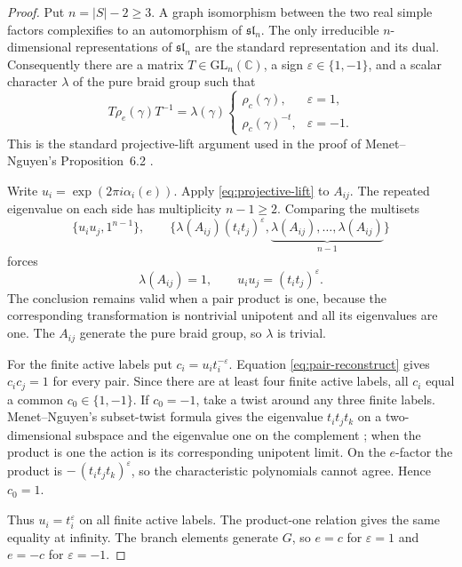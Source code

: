 \documentclass[11pt]{article}
\theoremstyle{definition}
\theoremstyle{remark}
\newcommand{\C}{\mathbb C}
\begin{document}
\begin{proof}
Put $n=|S|-2\ge3$.  A graph isomorphism between the two real simple factors complexifies to an automorphism of $\mathfrak{sl}_n$.  The only irreducible $n$-dimensional representations of $\mathfrak{sl}_n$ are the standard representation and its dual.  Consequently there are a matrix $T\in\mathrm{GL}_n(\C)$, a sign $\varepsilon\in\{1,-1\}$, and a scalar character $\lambda$ of the pure braid group such that
\begin{equation}\label{eq:projective-lift}
 T\rho_e(\gamma)T^{-1}
 =\lambda(\gamma)\begin{cases}
 \rho_c(\gamma),&\varepsilon=1,\\
 \rho_c(\gamma)^{-t},&\varepsilon=-1.
 \end{cases}
\end{equation}
This is the standard projective-lift argument used in the proof of Menet--Nguyen's Proposition~6.2 \cite{MN}.

Write $u_i=\exp(2\pi i\alpha_i(e))$.  Apply \eqref{eq:projective-lift} to $A_{ij}$.  The repeated eigenvalue on each side has multiplicity $n-1\ge2$.  Comparing the multisets
\[
 \{u_iu_j,1^{n-1}\},
 \qquad
 \{\lambda(A_{ij})(t_it_j)^\varepsilon,
       \underbrace{\lambda(A_{ij}),\ldots,\lambda(A_{ij})}_{n-1}\}
\]
forces
\begin{equation}\label{eq:pair-reconstruct}
 \lambda(A_{ij})=1,
 \qquad
 u_iu_j=(t_it_j)^\varepsilon.
\end{equation}
The conclusion remains valid when a pair product is one, because the corresponding transformation is nontrivial unipotent and all its eigenvalues are one.  The $A_{ij}$ generate the pure braid group, so $\lambda$ is trivial.

For the finite active labels put $c_i=u_it_i^{-\varepsilon}$.  Equation \eqref{eq:pair-reconstruct} gives $c_ic_j=1$ for every pair.  Since there are at least four finite active labels, all $c_i$ equal a common $c_0\in\{1,-1\}$.  If $c_0=-1$, take a twist around any three finite labels.  Menet--Nguyen's subset-twist formula gives the eigenvalue $t_it_jt_k$ on a two-dimensional subspace and the eigenvalue one on the complement \cite[Theorem~2.8]{MN}; when the product is one the action is its corresponding unipotent limit.  On the $e$-factor the product is $-\,(t_it_jt_k)^\varepsilon$, so the characteristic polynomials cannot agree.  Hence $c_0=1$.

Thus $u_i=t_i^\varepsilon$ on all finite active labels.  The product-one relation gives the same equality at infinity.  The branch elements generate $G$, so $e=c$ for $\varepsilon=1$ and $e=-c$ for $\varepsilon=-1$.
\end{proof}
\end{document}
